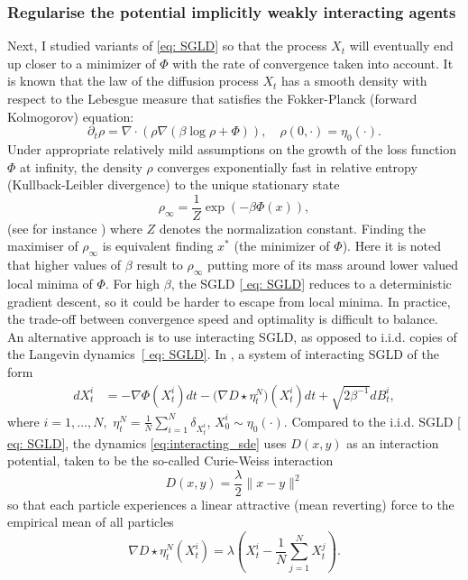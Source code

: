 \documentclass{article}
\begin{document}
\subsubsection{Regularise the potential implicitly weakly interacting agents}\label{sec: weakly interacting agents}

Next, I studied variants of \ref{eq: SGLD} so that the
process $X_{t}$ will eventually end up closer to a minimizer of $\Phi$ with the rate of convergence taken into account. It is known that the law of the diffusion process $X_{t}$
has a smooth density with respect to the Lebesgue measure that satisfies
the Fokker-Planck (forward Kolmogorov) equation: 
\[
\partial_{t}\rho=\nabla\cdot\left(\rho\nabla\left(\beta\log\rho+\Phi\right)\right),\quad\rho(0,\cdot)=\eta_{0}(\cdot).
\]
Under appropriate relatively mild assumptions on the growth of the loss function $\Phi$
at infinity, the density $\rho$ converges exponentially fast in relative
entropy (Kullback-Leibler divergence) to the unique stationary state
\[
\rho_{\infty}=\frac{1}{Z}\exp(-\beta\Phi(x)),
\]
(see for instance \cite[Ch. 4]{pavliotis2014stochastic}) where $Z$ denotes the normalization constant.
Finding the maximiser of $\rho_{\infty}$ is equivalent finding
$x^{*}$ (the minimizer of $ \Phi$). Here it is noted that higher values of $ \beta$
result to $\rho_{\infty}$ putting more of its mass around lower valued
local minima of $\Phi$. For high $\beta$, the SGLD \ref{ eq: SGLD}
reduces to a deterministic gradient descent, so it could be harder
to escape from local minima. In practice, the trade-off between convergence
speed and optimality is difficult to balance.\\

An alternative approach is to use interacting SGLD, as opposed to
i.i.d. copies of the Langevin dynamics~\ref{ eq: SGLD}. In \cite{kantas2019sharpflatshallowweakly}, a system of interacting SGLD of the form 
\begin{align}
dX_{t}^{i} & =-\nabla\Phi(X_{t}^{i})dt-\big(\nabla D\star\eta_{t}^{N}\big)(X_{t}^{i})dt+\sqrt{2\beta^{-1}}dB_{t}^{i},\label{eq:interacting_sde}
\end{align}
where $i=1,\ldots,N,$ $\eta_{t}^{N}=\frac{1}{N}\sum_{i=1}^{N}\delta_{X_{t}^{i}}$,
$X_{0}^{i}\sim\eta_{0}(\cdot)$. Compared to the i.i.d. SGLD \ref{ eq: SGLD},
the dynamics \ref{eq:interacting_sde} uses $D(x,y)$ as an interaction
potential, taken to be the so-called Curie-Weiss interaction
\begin{equation}
D(x,y)=\frac{\lambda}{2}\|x-y\|^{2}\label{e:inter}
\end{equation}
so that each particle experiences a linear attractive (mean reverting)
force to the empirical mean of all particles 
\[
\nabla D\star\eta_{t}^{N}(X_{t}^{i})=\lambda\left(X_{t}^{i}-\frac{1}{N}\sum_{j=1}^{N}X_{t}^{j}\right).
\]
\end{document}
